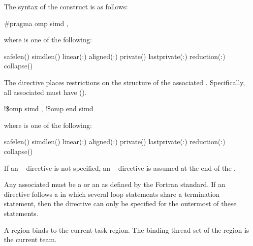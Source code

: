 \syntax
The syntax of the  construct is as follows:

\ccppspecificstart
\begin{boxedcode}
\#pragma omp simd \plc{[clause[ [},\plc{] clause] ... ] new-line}
\end{boxedcode}

where  is one of the following:

\begin{indentedcodelist}
safelen()
simdlen()
linear(\plc{list[ }:\plc{ linear-step]})
aligned(\plc{list[ }:\plc{ alignment]})
private()
lastprivate(\plc{[ lastprivate-modifier}:\plc{] list})
reduction(:)
collapse()
\end{indentedcodelist}

The  directive places restrictions on the structure of the associated . 
Specifically, all associated  must have  
().
\ccppspecificend

\fortranspecificstart
\begin{boxedcode}
!\$omp simd \plc{[clause[ [},\plc{] clause ... ]}
\plc{[}!\$omp end simd\plc{]}
\end{boxedcode}

where  is one of the following:

\begin{indentedcodelist}
safelen()
simdlen()
linear(\plc{list[ }:\plc{ linear-step]})
aligned(\plc{list[ }:\plc{ alignment]})
private()
lastprivate(\plc{[ lastprivate-modifier}:\plc{] list})
reduction(:)
collapse()
\end{indentedcodelist}

If an ~ directive is not specified, an ~ directive is assumed at the end 
of the .

Any associated  must be a  or an 
 as defined by the Fortran standard. If an 
~ directive follows a  in which 
several loop statements share a  termination statement, then the 
directive can only be specified for the outermost of these 
 statements. 
\fortranspecificend

\binding
A  region binds to the current task region. The binding thread set of the  
region is the current team.

